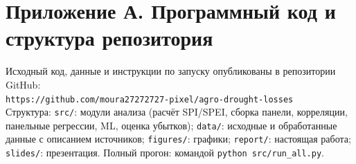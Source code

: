 \documentclass[14pt,a4paper]{extarticle}
\begin{document}
\section*{Приложение А. Программный код и структура репозитория}

Исходный код, данные и инструкции по запуску опубликованы в репозитории GitHub:\\
\texttt{https://github.com/moura27272727-pixel/agro-drought-losses}\\[4pt]
Структура: \texttt{src/}: модули анализа (расчёт SPI/SPEI, сборка панели, корреляции, панельные регрессии, ML, оценка убытков); \texttt{data/}: исходные и обработанные данные с описанием источников; \texttt{figures/}: графики; \texttt{report/}: настоящая работа; \texttt{slides/}: презентация. Полный прогон: командой \texttt{python src/run\_all.py}.
\end{document}
